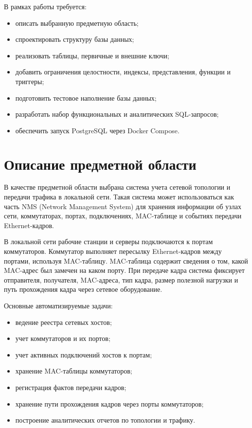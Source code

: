 \documentclass[12pt,a4paper]{article}
\begin{document}
В рамках работы требуется:
\begin{itemize}
    \item описать выбранную предметную область;
    \item спроектировать структуру базы данных;
    \item реализовать таблицы, первичные и внешние ключи;
    \item добавить ограничения целостности, индексы, представления, функции и триггеры;
    \item подготовить тестовое наполнение базы данных;
    \item разработать набор функциональных и аналитических SQL-запросов;
    \item обеспечить запуск PostgreSQL через Docker Compose.
\end{itemize}

\section{Описание предметной области}

В качестве предметной области выбрана система учета сетевой топологии и передачи трафика в локальной сети. Такая система может использоваться как часть NMS (Network Management System) для хранения информации об узлах сети, коммутаторах, портах, подключениях, MAC-таблице и событиях передачи Ethernet-кадров.

В локальной сети рабочие станции и серверы подключаются к портам коммутаторов. Коммутатор выполняет пересылку Ethernet-кадров между портами, используя MAC-таблицу. MAC-таблица содержит сведения о том, какой MAC-адрес был замечен на каком порту. При передаче кадра система фиксирует отправителя, получателя, MAC-адреса, тип кадра, размер полезной нагрузки и путь прохождения кадра через сетевое оборудование.

Основные автоматизируемые задачи:
\begin{itemize}
    \item ведение реестра сетевых хостов;
    \item учет коммутаторов и их портов;
    \item учет активных подключений хостов к портам;
    \item хранение MAC-таблицы коммутаторов;
    \item регистрация фактов передачи кадров;
    \item хранение пути прохождения кадров через порты коммутаторов;
    \item построение аналитических отчетов по топологии и трафику.
\end{itemize}
\end{document}
